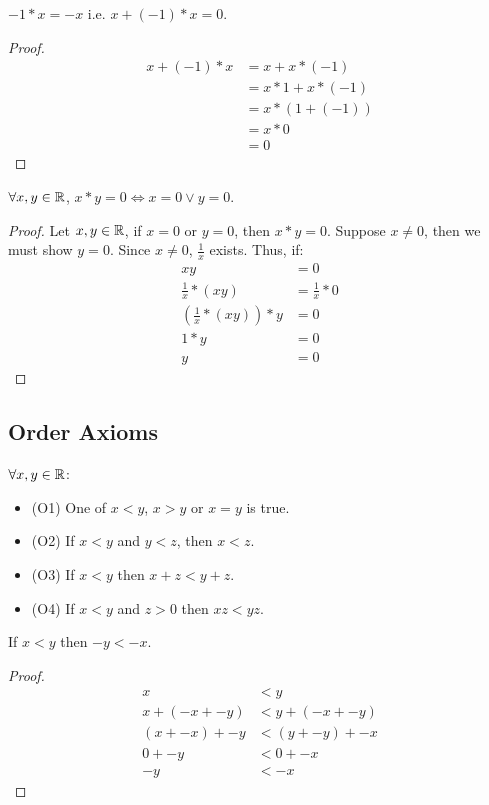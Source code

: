 \begin{theorem}
    $-1 * x = -x$ i.e. $x + (-1) * x = 0$.
\end{theorem}
\begin{proof}
    \begin{align*}
        x + (-1) * x &= x + x * (-1) \\
        &= x * 1 + x * (-1) \\
        &= x * (1 + (-1)) \\
        &= x * 0 \\
        &= 0
    \end{align*}
\end{proof}

\begin{theorem}
    $\forall x, y \in \mathbb{R}$, $x * y = 0 \iff x = 0 \lor y = 0$.
\end{theorem}
\begin{proof}
    Let $x, y \in \mathbb{R}$, if $x = 0$ or $y = 0$, then $x * y = 0$. Suppose $x \neq 0$, then we must show $y = 0$. Since $x \neq 0$, $\frac{1}{x}$ exists. Thus, if:
    \begin{align*}
        xy &= 0 \\
        \frac{1}{x} * (xy) &= \frac{1}{x} * 0 \\
        (\frac{1}{x} * (xy)) * y &= 0 \\
        1 * y &= 0 \\
        y &= 0
    \end{align*}
\end{proof}

\subsection{Order Axioms} $\forall x, y \in \mathbb{R}$:
\begin{itemize}
    \item (O1) One of $x < y$, $x > y$ or $x = y$ is true.
    \item (O2) If $x < y$ and $y < z$, then $x < z$.
    \item (O3) If $x < y$ then $x + z < y + z$.
    \item (O4) If $x < y$ and $z > 0$ then $xz < yz$.
\end{itemize}

\begin{theorem}
    If $x < y$ then $-y < -x$.
\end{theorem}
\begin{proof}
    \begin{align*}
        x &< y \\
        x + (-x + -y) &< y + (-x + -y) \\
        (x + -x) + -y &< (y + -y) + -x \\
        0 + -y &< 0 + -x \\
        -y &< -x
    \end{align*}
\end{proof}

